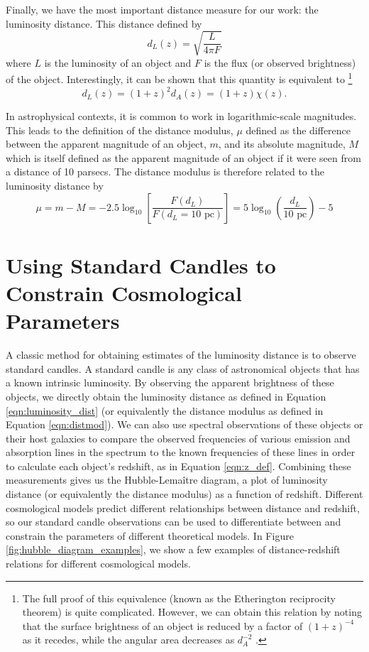 Finally, we have the most important distance measure for our work: the luminosity distance. This distance defined by
\begin{equation}
    d_L(z) = \sqrt{\frac{L}{4\pi F}}
    \label{eqn:luminosity_dist}
\end{equation}
where $L$ is the luminosity of an object and $F$ is the flux (or observed brightness) of the object. Interestingly, it can be shown that this quantity is equivalent to \footnote{The full proof of this equivalence (known as the Etherington reciprocity theorem) is quite complicated. However, we can obtain this relation by noting that the surface brightness of an object is reduced by a factor of $(1+z)^{-4}$ as it recedes, while the angular area decreases as $d_A^{-2}$ \cite{hogg_distance_1999}.}
\begin{equation}
    d_L(z) = (1+z)^2 d_A(z) = (1+z)\chi(z).
    \label{eqn:luminosity_dist_z}
\end{equation}


In astrophysical contexts, it is common to work in logarithmic-scale magnitudes. This leads to the definition of the distance modulus, $\mu$ defined as the difference between the apparent magnitude of an object, $m$, and its absolute magnitude, $M$ which is itself defined as the apparent magnitude of an object if it were seen from a distance of 10 parsecs. The distance modulus is therefore related to the luminosity distance by
\begin{equation}
    \mu = m - M
    = -2.5 \log_{10}\left[\frac{F(d_L)}{F(d_L = 10\textrm{ pc})}\right] = 5 \log_{10}\left(\frac{d_L}{10\textrm{ pc}}\right) - 5
    \label{eqn:distmod}
\end{equation}

\section{Using Standard Candles to Constrain Cosmological Parameters}
A classic method for obtaining estimates of the luminosity distance is to observe standard candles. A standard candle is any class of astronomical objects that has a known intrinsic luminosity. By observing the apparent brightness of these objects, we directly obtain the luminosity distance as defined in Equation \ref{eqn:luminosity_dist} (or equivalently the distance modulus as defined in Equation \ref{eqn:distmod}). We can also use spectral observations of these objects or their host galaxies to compare the observed frequencies of various emission and absorption lines in the spectrum to the known frequencies of these lines in order to calculate each object's redshift, as in Equation \ref{eqn:z_def}. Combining these measurements gives us the Hubble-Lema\^{i}tre diagram, a plot of luminosity distance (or equivalently the distance modulus) as a function of redshift. Different cosmological models predict different relationships between distance and redshift, so our standard candle observations can be used to differentiate between and constrain the parameters of different theoretical models. In Figure \ref{fig:hubble_diagram_examples}, we show a few examples of distance-redshift relations for different cosmological models.

